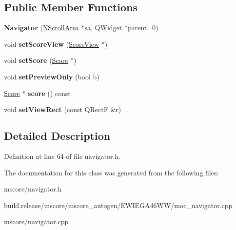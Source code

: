 \subsection*{Public Member Functions}
\begin{DoxyCompactItemize}
\item 
\mbox{\label{class_ms_1_1_navigator_af8f08e876a931dd292da1b1961bad68f}} 
{\bfseries Navigator} (\hyperlink{class_ms_1_1_n_scroll_area}{N\+Scroll\+Area} $\ast$sa, Q\+Widget $\ast$parent=0)
\item 
\mbox{\label{class_ms_1_1_navigator_ac8b25633ae7447f91d91f173f9b39d1a}} 
void {\bfseries set\+Score\+View} (\hyperlink{class_ms_1_1_score_view}{Score\+View} $\ast$)
\item 
\mbox{\label{class_ms_1_1_navigator_ae0470c8eae6a6bd3509c78f29edfb83a}} 
void {\bfseries set\+Score} (\hyperlink{class_ms_1_1_score}{Score} $\ast$)
\item 
\mbox{\label{class_ms_1_1_navigator_a8ed89ae058a9ff64cc4ec6a04a0d1e32}} 
void {\bfseries set\+Preview\+Only} (bool b)
\item 
\mbox{\label{class_ms_1_1_navigator_a5f418a4cc0827b684361e339310cf955}} 
\hyperlink{class_ms_1_1_score}{Score} $\ast$ {\bfseries score} () const
\item 
\mbox{\label{class_ms_1_1_navigator_a6faeafc819f184a0b387cacebc1899a5}} 
void {\bfseries set\+View\+Rect} (const Q\+RectF \&r)
\end{DoxyCompactItemize}


\subsection{Detailed Description}


Definition at line 64 of file navigator.\+h.



The documentation for this class was generated from the following files\+:\begin{DoxyCompactItemize}
\item 
mscore/navigator.\+h\item 
build.\+release/mscore/mscore\+\_\+autogen/\+E\+W\+I\+E\+G\+A46\+W\+W/moc\+\_\+navigator.\+cpp\item 
mscore/navigator.\+cpp\end{DoxyCompactItemize}
